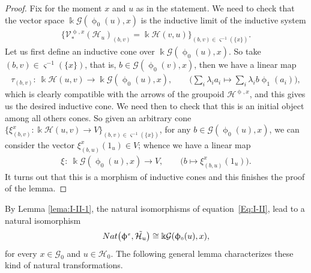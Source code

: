 \documentclass[11pt]{article}
\numberwithin{equation}{section}
\newcommand{\Go}{\cG_{\Sscript{0}}}
\newcommand{\Ho}{\cH_{\Sscript{0}}}
\newcommand{\vV}{\mathscr{V}}
\newcommand{\cG}{{\mathcal G}}
\newcommand{\cH}{{\mathcal H}}
\newcommand{\Sscript}[1]{\scriptscriptstyle{#1}}
\newcommand{\phio}{\upphi_{\Sscript{0}}}
\newcommand{\phia}{\upphi_{\Sscript{1}}}
\begin{document}
\begin{proof}Fix for the moment $x$ and $u$ as in the statement. We need to check that the vector space $\Bbbk \cG(\phio(u), x)$ is the inductive limit of the inductive system
\begin{gather*}
\big\{ \vV^{\Sscript{\upphi, x}}_*(\cH_{u})_{\Sscript{(b, v)}}=\Bbbk \cH(v,u) \big\}_{\Sscript{(b, v) \in \varsigma^{-1}(\{x\})}}.
\end{gather*}
Let us first define an inductive cone over $\Bbbk \cG(\phio(u), x)$. So take $(b,v) \in \varsigma^{-1}(\{x\})$, that is, $b \in \cG(\phio(v), x)$, then we have a linear map
\begin{gather*}
\tau_{\Sscript{(b, v)}}\colon \ \Bbbk \cH(u,v) \longrightarrow \Bbbk\cG(\phio(u), x),\qquad \bigg( \sum_{i}\lambda_{i} a_{i} \longmapsto \sum_{i}\lambda_{i} b\phia(a_{i})\bigg),
\end{gather*}
which is clearly compatible with the arrows of the groupoid $\cH^{\Sscript{\upphi, x}}$, and this gives us the desired inductive cone. We need then to check that this is an initial object among all others cones. So given an arbitrary cone $\big\{\xi^{\Sscript{x}}_{\Sscript{(b, v)}}\colon \Bbbk\cH(u,v) \to V\big\}_{\Sscript{(b, v)} \in \varsigma^{-1}(\{x\}) }$, for any $b \in \cG(\phio(u), x)$, we can consider the vector $\xi^{\Sscript{x}}_{\Sscript{(b, u)}}(1_{u}) \in V$; whence we have a linear map
\begin{gather*}
\xi_{ }\colon \ \Bbbk \cG(\phio(u),x) \longrightarrow V, \qquad \big( b \longmapsto \xi^{\Sscript{x}}_{\Sscript{(b, u)}}(1_{u}) \big).
\end{gather*}
It turns out that this is a morphism of inductive cones and this finishes the proof of the lem\-ma.
\end{proof}

By Lemma \ref{lema:I-II-1}, the natural isomorphisms of equation~\eqref{Eq:I-II}, lead to a natural isomorphism
\begin{gather*}
{\rm Nat}\big(\upphi^{\Sscript{x}}, \tilde{\cH_{u}}\big) \cong \Bbbk \cG(\phio(u),x),
\end{gather*}
for every $x \in \Go$ and $u \in \Ho$. The following general lemma characterizes these kind of natural transformations.
\end{document}
